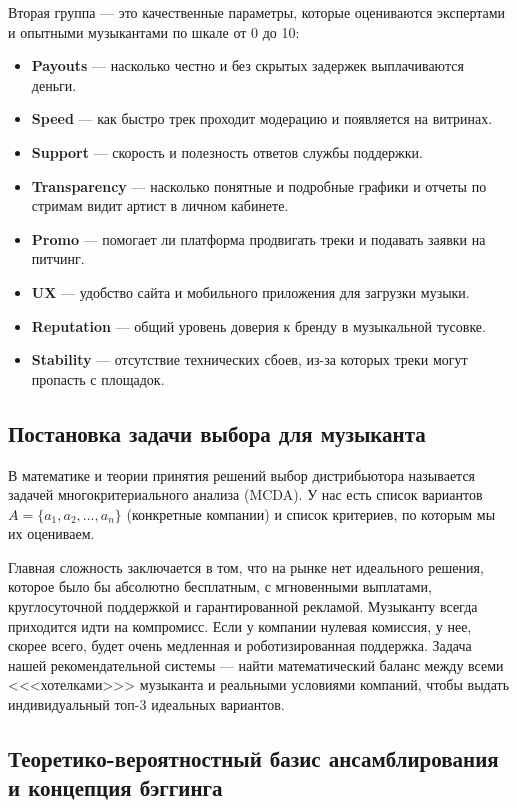 \documentclass[14pt, a4paper]{extarticle}
\begin{document}
Вторая группа — это качественные параметры, которые оцениваются экспертами и опытными музыкантами по шкале от 0 до 10:
\begin{itemize}
    \item \textbf{Payouts} — насколько честно и без скрытых задержек выплачиваются деньги.
    \item \textbf{Speed} — как быстро трек проходит модерацию и появляется на витринах.
    \item \textbf{Support} — скорость и полезность ответов службы поддержки.
    \item \textbf{Transparency} — насколько понятные и подробные графики и отчеты по стримам видит артист в личном кабинете.
    \item \textbf{Promo} — помогает ли платформа продвигать треки и подавать заявки на питчинг.
    \item \textbf{UX} — удобство сайта и мобильного приложения для загрузки музыки.
    \item \textbf{Reputation} — общий уровень доверия к бренду в музыкальной тусовке.
    \item \textbf{Stability} — отсутствие технических сбоев, из-за которых треки могут пропасть с площадок.
\end{itemize}

\subsection{Постановка задачи выбора для музыканта}
В математике и теории принятия решений выбор дистрибьютора называется задачей многокритериального анализа (MCDA). У нас есть список вариантов $A = \{a_1, a_2, \dots, a_n\}$ (конкретные компании) и список критериев, по которым мы их оцениваем. 

Главная сложность заключается в том, что на рынке нет идеального решения, которое было бы абсолютно бесплатным, с мгновенными выплатами, круглосуточной поддержкой и гарантированной рекламой. Музыканту всегда приходится идти на компромисс. Если у компании нулевая комиссия, у нее, скорее всего, будет очень медленная и роботизированная поддержка. Задача нашей рекомендательной системы — найти математический баланс между всеми <<<хотелками>>> музыканта и реальными условиями компаний, чтобы выдать индивидуальный топ-3 идеальных вариантов.
\subsection{Теоретико-вероятностный базис ансамблирования и концепция бэггинга}
\end{document}
